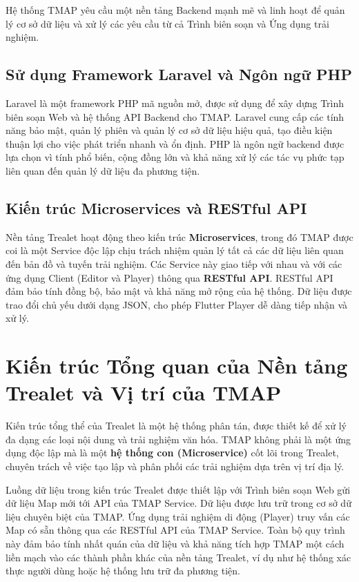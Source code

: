 Hệ thống TMAP yêu cầu một nền tảng Backend mạnh mẽ và linh hoạt để quản lý cơ sở dữ liệu và xử lý các yêu cầu từ cả Trình biên soạn và Ứng dụng trải nghiệm.

\subsection{Sử dụng Framework Laravel và Ngôn ngữ PHP}

Laravel là một framework PHP mã nguồn mở, được sử dụng để xây dựng Trình biên soạn Web và hệ thống API Backend cho TMAP. Laravel cung cấp các tính năng bảo mật, quản lý phiên và quản lý cơ sở dữ liệu hiệu quả, tạo điều kiện thuận lợi cho việc phát triển nhanh và ổn định. PHP là ngôn ngữ backend được lựa chọn vì tính phổ biến, cộng đồng lớn và khả năng xử lý các tác vụ phức tạp liên quan đến quản lý dữ liệu đa phương tiện.

\subsection{Kiến trúc Microservices và RESTful API}

Nền tảng Trealet hoạt động theo kiến trúc \textbf{Microservices}, trong đó TMAP được coi là một Service độc lập chịu trách nhiệm quản lý tất cả các dữ liệu liên quan đến bản đồ và tuyến trải nghiệm. Các Service này giao tiếp với nhau và với các ứng dụng Client (Editor và Player) thông qua \textbf{RESTful API}. RESTful API đảm bảo tính đồng bộ, bảo mật và khả năng mở rộng của hệ thống. Dữ liệu được trao đổi chủ yếu dưới dạng JSON, cho phép Flutter Player dễ dàng tiếp nhận và xử lý.

\section{Kiến trúc Tổng quan của Nền tảng Trealet và Vị trí của TMAP}

Kiến trúc tổng thể của Trealet là một hệ thống phân tán, được thiết kế để xử lý đa dạng các loại nội dung và trải nghiệm văn hóa. TMAP không phải là một ứng dụng độc lập mà là một \textbf{hệ thống con (Microservice)} cốt lõi trong Trealet, chuyên trách về việc tạo lập và phân phối các trải nghiệm dựa trên vị trí địa lý.

Luồng dữ liệu trong kiến trúc Trealet được thiết lập với Trình biên soạn Web gửi dữ liệu Map mới tới API của TMAP Service. Dữ liệu được lưu trữ trong cơ sở dữ liệu chuyên biệt của TMAP. Ứng dụng trải nghiệm di động (Player) truy vấn các Map có sẵn thông qua các RESTful API của TMAP Service. Toàn bộ quy trình này đảm bảo tính nhất quán của dữ liệu và khả năng tích hợp TMAP một cách liền mạch vào các thành phần khác của nền tảng Trealet, ví dụ như hệ thống xác thực người dùng hoặc hệ thống lưu trữ đa phương tiện.

